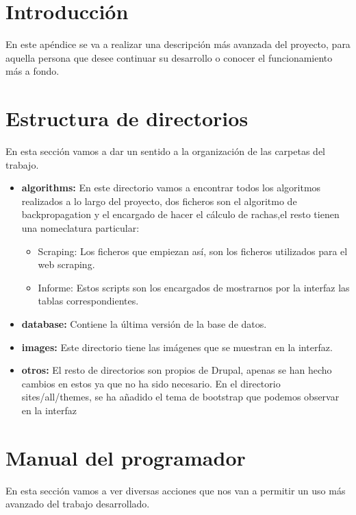 
\section{Introducción}
En este apéndice se va a realizar una descripción más avanzada del proyecto, para aquella persona que desee continuar su desarrollo o conocer el funcionamiento más a fondo.

\section{Estructura de directorios}
En esta sección vamos a dar un sentido a la organización de las carpetas del trabajo.

\begin{itemize}

\item\textbf{algorithms:} En este directorio vamos a encontrar todos los algoritmos realizados a lo largo del proyecto, dos ficheros son el algoritmo de backpropagation y el encargado de hacer el cálculo de rachas,el resto tienen una nomeclatura particular:
\begin{itemize}
\item Scraping: Los ficheros que empiezan así, son los ficheros utilizados para el web scraping.
\item Informe: Estos scripts son los encargados de mostrarnos por la interfaz las tablas correspondientes.
\end{itemize}
\item\textbf{database:} Contiene la última versión de la base de datos.

\item\textbf{images:} Este directorio tiene las imágenes que se muestran en la interfaz.

\item\textbf{otros:} El resto de directorios son propios de Drupal, apenas se han hecho cambios en estos ya que no ha sido necesario. En el directorio sites/all/themes, se ha añadido el tema de bootstrap que podemos observar en la interfaz
\end{itemize}

\section{Manual del programador}

En esta sección vamos a ver diversas acciones que nos van a permitir un uso más avanzado del trabajo desarrollado.

